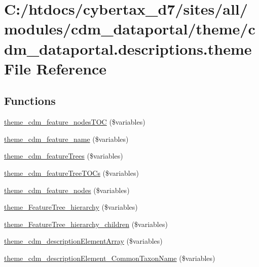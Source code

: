 \hypertarget{cdm__dataportal_8descriptions_8theme}{\section{C\-:/htdocs/cybertax\-\_\-d7/sites/all/modules/cdm\-\_\-dataportal/theme/cdm\-\_\-dataportal.descriptions.\-theme File Reference}
\label{cdm__dataportal_8descriptions_8theme}
}
\subsection*{Functions}
\begin{DoxyCompactItemize}
\item 
\hyperlink{cdm__dataportal_8descriptions_8theme_a4d58f96600ef64e936dbae0f2033dc18}{theme\-\_\-cdm\-\_\-feature\-\_\-nodes\-T\-O\-C} (\$variables)
\item 
\hyperlink{cdm__dataportal_8descriptions_8theme_ad4b0b33732acc7c2504a272458ad990e}{theme\-\_\-cdm\-\_\-feature\-\_\-name} (\$variables)
\item 
\hyperlink{cdm__dataportal_8descriptions_8theme_ada925bf8110f8c3ee5b11bbca0c78229}{theme\-\_\-cdm\-\_\-feature\-Trees} (\$variables)
\item 
\hyperlink{cdm__dataportal_8descriptions_8theme_ada1c2406dd070909de439e176fe2856b}{theme\-\_\-cdm\-\_\-feature\-Tree\-T\-O\-Cs} (\$variables)
\item 
\hyperlink{cdm__dataportal_8descriptions_8theme_a96940d3a69ad747032e4bd657969c4dd}{theme\-\_\-cdm\-\_\-feature\-\_\-nodes} (\$variables)
\item 
\hyperlink{cdm__dataportal_8descriptions_8theme_ada1fbb453b6124726bae5dc5d1911134}{theme\-\_\-\-Feature\-Tree\-\_\-hierarchy} (\$variables)
\item 
\hyperlink{cdm__dataportal_8descriptions_8theme_accc8982026ac8f39acc894cf3235ebf4}{theme\-\_\-\-Feature\-Tree\-\_\-hierarchy\-\_\-children} (\$variables)
\item 
\hyperlink{cdm__dataportal_8descriptions_8theme_a10120b07fb8855b527da50921c68ef52}{theme\-\_\-cdm\-\_\-description\-Element\-Array} (\$variables)
\item 
\hyperlink{cdm__dataportal_8descriptions_8theme_ad5669293078b2c26bad927950f256503}{theme\-\_\-cdm\-\_\-description\-Element\-\_\-\-Common\-Taxon\-Name} (\$variables)

\end{DoxyCompactItemize}
